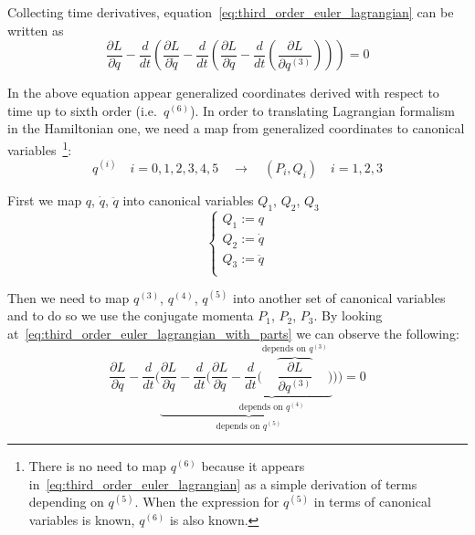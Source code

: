 Collecting time derivatives, equation~\eqref{eq:third_order_euler_lagrangian}
can be written as
\begin{equation} \label{eq:third_order_euler_lagrangian_with_parts}
  \frac{\partial L}{\partial q} -
  \frac{d}{dt} \left(
  \frac{\partial L}{\partial \dot{q}} -
  \frac{d}{dt} \left(
  \frac{\partial L}{\partial \ddot{q}} -
  \frac{d}{dt} \left(
  \frac{\partial L}{\partial q^{(3)}}
  \right)\right)\right) = 0
\end{equation}

In the above equation appear generalized coordinates derived with respect to
time up to sixth order (i.e.\ $q^{(6)}$). In order to translating Lagrangian
formalism in the Hamiltonian one, we need a map from generalized coordinates to
canonical variables~\footnote{
  There is no need to map $q^{(6)}$ because it appears
  in~\eqref{eq:third_order_euler_lagrangian} as a simple derivation of terms
  depending on $q^{(5)}$. When the expression for $q^{(5)}$ in terms of
  canonical variables is known, $q^{(6)}$ is also known.
}:
\begin{equation*}
  q^{(i)} \quad i = 0, 1, 2, 3, 4, 5
  \quad \longrightarrow \quad
  (P_i , Q_i) \quad i = 1, 2, 3
\end{equation*}

First we map $q$, $\dot{q}$, $\ddot{q}$ into canonical variables $Q_1$, $Q_2$,
$Q_3$
\begin{equation}\label{eq:def_Q}
  \begin{cases}
    Q_1 := q \\
    Q_2 := \dot{q} \\
    Q_3 := \ddot{q} \\
  \end{cases}
\end{equation}

Then we need to map $q^{(3)}$, $q^{(4)}$, $q^{(5)}$ into another set of
canonical variables and to do so we use the conjugate momenta $P_1$, $P_2$,
$P_3$. By looking at~\eqref{eq:third_order_euler_lagrangian_with_parts} we can
observe the following:
\begin{equation} \label{eq:third_order_euler_lagrangian_h_with_parts}
  \frac{\partial L}{\partial q} -
  \frac{d}{dt} \biggl(
  \underbrace{
  \frac{\partial L}{\partial \dot{q}} -
  \frac{d}{dt} \biggl(
  \underbrace{
  \frac{\partial L}{\partial \ddot{q}} -
  \frac{d}{dt} \biggl(
  \overbrace{
  \frac{\partial L}{\partial q^{(3)}}
  }^{\text{depends on } q^{(3)}} \biggr)
  }_{\text{depends on } q^{(4)}} \biggr)
  }_{\text{depends on } q^{(5)}} \biggr)
  = 0
\end{equation}

